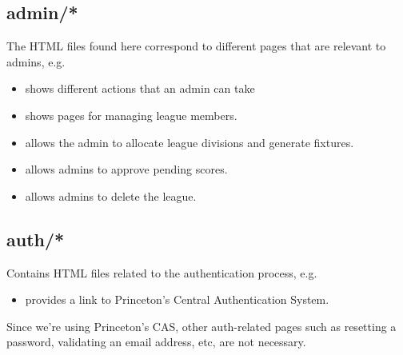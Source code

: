 \documentclass[letterpaper,10pt,english]{sphinxmanual}
\begin{document}
\subsection{admin/*}
\label{\detokenize{tiger_leagues/templates/readme:admin}}
The HTML files found here correspond to different pages that are relevant to
admins, e.g.
\begin{itemize}
\item {} 
 shows different actions that an admin can take

\item {} 
 shows pages for managing league members.

\item {} 
 allows the admin to allocate league divisions and
generate fixtures.

\item {} 
 allows admins to approve pending scores.

\item {} 
 allows admins to delete the league.

\end{itemize}


\subsection{auth/*}
\label{\detokenize{tiger_leagues/templates/readme:auth}}
Contains HTML files related to the authentication process, e.g.
\begin{itemize}
\item {} 
 provides a link to Princeton’s Central Authentication System.

\end{itemize}

Since we’re using Princeton’s CAS, other auth-related pages such as resetting
a password, validating an email address, etc, are not necessary.
\end{document}
